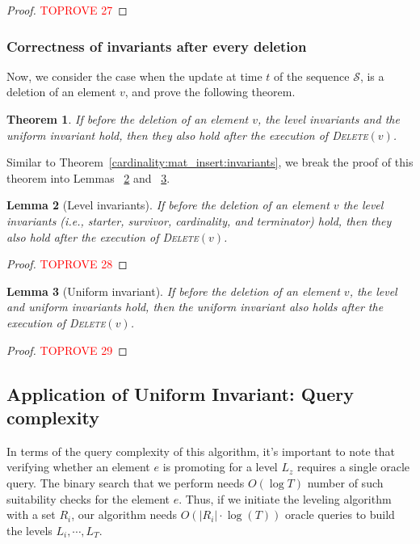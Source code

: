 \documentclass[11pt]{article}
\newtheorem{theorem}{Theorem}
\newtheorem{lemma}[theorem]{Lemma}
\newcommand{\deletev}{{\textsc{Delete}}}
\begin{document}
\begin{proof}\textcolor{red}{TOPROVE 27}\end{proof}




\subsubsection{Correctness of invariants after every deletion}

Now, we consider the case when the update at time $t$ of the sequence $\mathcal{S}$, is a deletion of an element $v$, and prove the following theorem. 

\begin{theorem}
\label{cardinality:mat_delete:invariants}
If before the deletion of an element $v$, the level invariants and the uniform invariant hold, then they also hold after the execution of \deletev$(v)$. 
\end{theorem}

Similar to Theorem~\ref{cardinality:mat_insert:invariants}, we break the proof of this theorem into 
Lemmas ~\ref{cardinality:mat_delete_level} and ~\ref{cardinality:mat_delete_uni}.


\begin{lemma}[Level invariants]
\label{cardinality:mat_delete_level}
If before the deletion of an element $v$ the level invariants (i.e., starter, survivor, cardinality, and terminator) hold, 
then they also hold after the execution of \deletev$(v)$. 
\end{lemma}

\begin{proof}\textcolor{red}{TOPROVE 28}\end{proof}





\begin{lemma} [Uniform invariant]
\label{cardinality:mat_delete_uni}
If before the deletion of an element $v$, the level and uniform invariants hold, then the uniform invariant also holds after the execution of \deletev$(v)$. 
\end{lemma}


\begin{proof}\textcolor{red}{TOPROVE 29}\end{proof}



\subsection{Application of Uniform Invariant: Query complexity}
In terms of the query complexity of this algorithm, it's important to note that verifying whether an element $e$ is promoting for a level $L_z$ requires a single oracle query.
The binary search that we perform needs $O(\log T)$ number of such suitability checks for the element $e$. 
Thus, if we initiate the leveling algorithm with a set $R_i$, 
our algorithm needs $O(|R_i|\cdot \log(T))$ oracle queries to build the levels $L_i,\cdots, L_T$. 
\end{document}

